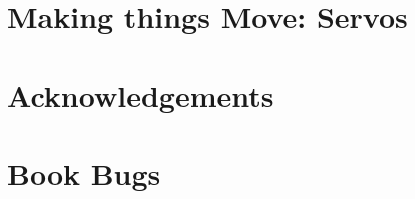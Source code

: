 \documentclass[a5paper,oneside]{scrbook}
\begin{document}
\chapter{Making things Move: Servos\label{ch7}}



%

\chapter{Acknowledgements\label{acknowledgements}}


\chapter{Book Bugs\label{bugs}}

\end{document}
